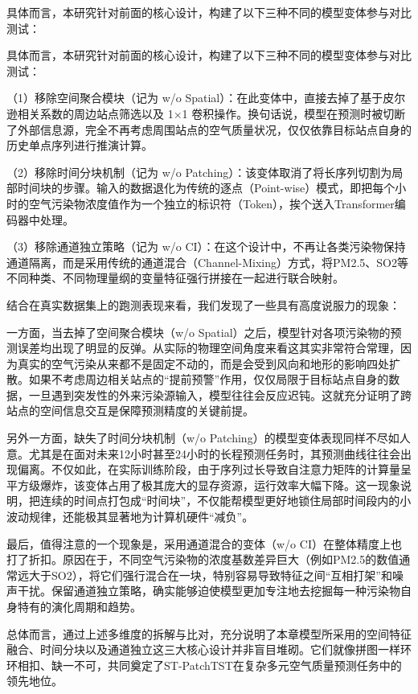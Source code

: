 具体而言，本研究针对前面的核心设计，构建了以下三种不同的模型变体参与对比测试：

具体而言，本研究针对前面的核心设计，构建了以下三种不同的模型变体参与对比测试：

（1）移除空间聚合模块（记为 w/o Spatial）：在此变体中，直接去掉了基于皮尔逊相关系数的周边站点筛选以及 1×1 卷积操作。换句话说，模型在预测时被切断了外部信息源，完全不再考虑周围站点的空气质量状况，仅仅依靠目标站点自身的历史单点序列进行推演计算。

（2）移除时间分块机制（记为 w/o Patching）：该变体取消了将长序列切割为局部时间块的步骤。输入的数据退化为传统的逐点（Point-wise）模式，即把每个小时的空气污染物浓度值作为一个独立的标识符（Token），挨个送入Transformer编码器中处理。

（3）移除通道独立策略（记为 w/o CI）：在这个设计中，不再让各类污染物保持通道隔离，而是采用传统的通道混合（Channel-Mixing）方式，将PM2.5、SO2等不同种类、不同物理量纲的变量特征强行拼接在一起进行联合映射。

结合在真实数据集上的跑测表现来看，我们发现了一些具有高度说服力的现象：

一方面，当去掉了空间聚合模块（w/o Spatial）之后，模型针对各项污染物的预测误差均出现了明显的反弹。从实际的物理空间角度来看这其实非常符合常理，因为真实的空气污染从来都不是固定不动的，而是会受到风向和地形的影响四处扩散。如果不考虑周边相关站点的“提前预警”作用，仅仅局限于目标站点自身的数据，一旦遇到突发性的外来污染源输入，模型往往会反应迟钝。这就充分证明了跨站点的空间信息交互是保障预测精度的关键前提。

另外一方面，缺失了时间分块机制（w/o Patching）的模型变体表现同样不尽如人意。尤其是在面对未来12小时甚至24小时的长程预测任务时，其预测曲线往往会出现偏离。不仅如此，在实际训练阶段，由于序列过长导致自注意力矩阵的计算量呈平方级爆炸，该变体占用了极其庞大的显存资源，运行效率大幅下降。这一现象说明，把连续的时间点打包成“时间块”，不仅能帮模型更好地锁住局部时间段内的小波动规律，还能极其显著地为计算机硬件“减负”。

最后，值得注意的一个现象是，采用通道混合的变体（w/o CI）在整体精度上也打了折扣。原因在于，不同空气污染物的浓度基数差异巨大（例如PM2.5的数值通常远大于SO2），将它们强行混合在一块，特别容易导致特征之间“互相打架”和噪声干扰。保留通道独立策略，确实能够迫使模型更加专注地去挖掘每一种污染物自身特有的演化周期和趋势。

总体而言，通过上述多维度的拆解与比对，充分说明了本章模型所采用的空间特征融合、时间分块以及通道独立这三大核心设计并非盲目堆砌。它们就像拼图一样环环相扣、缺一不可，共同奠定了ST-PatchTST在复杂多元空气质量预测任务中的领先地位。

